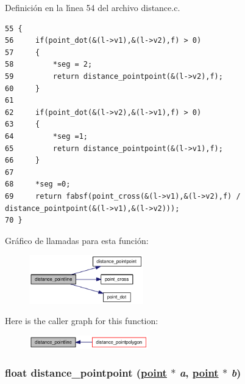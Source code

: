 Definici\'{o}n en la l\'{\i}nea 54 del archivo distance.c.

\begin{Code}\begin{verbatim}55 {
56     if(point_dot(&(l->v1),&(l->v2),f) > 0)
57     {
58         *seg = 2;
59         return distance_pointpoint(&(l->v2),f);
60     }
61 
62     if(point_dot(&(l->v2),&(l->v1),f) > 0)
63     {
64         *seg =1;
65         return distance_pointpoint(&(l->v1),f);
66     }
67 
68     *seg =0;
69     return fabsf(point_cross(&(l->v1),&(l->v2),f) / distance_pointpoint(&(l->v1),&(l->v2)));
70 }
\end{verbatim}\end{Code}




Gr\'{a}fico de llamadas para esta funci\'{o}n:\begin{figure}[H]
\begin{center}
\leavevmode
\includegraphics[width=140pt]{group__distance_g69a59a49134b784b0c8797e0e83e7c40_g69a59a49134b784b0c8797e0e83e7c40_cgraph}
\end{center}
\end{figure}


Here is the caller graph for this function:\begin{figure}[H]
\begin{center}
\leavevmode
\includegraphics[width=146pt]{group__distance_g69a59a49134b784b0c8797e0e83e7c40_g69a59a49134b784b0c8797e0e83e7c40_icgraph}
\end{center}
\end{figure}
\hypertarget{group__distance_g3b2b03f846e6b587be683ec8b853e774_g3b2b03f846e6b587be683ec8b853e774}{
\subsubsection[distance\_\-pointpoint]{\setlength{\rightskip}{0pt plus 5cm}float distance\_\-pointpoint (\hyperlink{struct__point}{point} $\ast$ {\em a}, \hyperlink{struct__point}{point} $\ast$ {\em b})}}
\label{group__distance_g3b2b03f846e6b587be683ec8b853e774_g3b2b03f846e6b587be683ec8b853e774}



